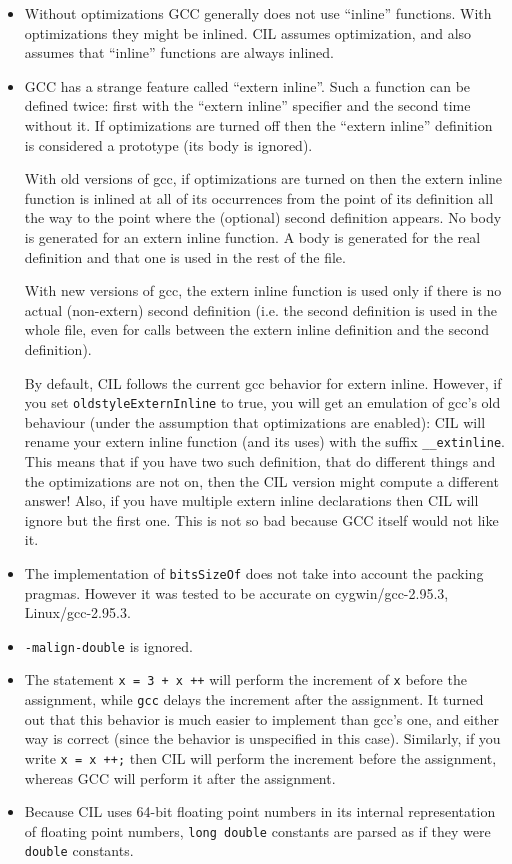 \documentclass[letterpaper]{article}
\def\t#1{{\tt #1}}
\begin{document}
\begin{itemize}
\item Without optimizations GCC generally does not use ``inline'' functions.
With optimizations they might be inlined. CIL assumes optimization, and also
assumes that ``inline'' functions are always inlined.

\item GCC has a strange feature called ``extern inline''. Such a function can
be defined twice: first with the ``extern inline'' specifier and the second
time without it. If optimizations are turned off then the ``extern inline''
definition is considered a prototype (its body is ignored).

With old versions of gcc, if optimizations
are turned on then the extern inline function is inlined at all of its
occurrences from the point of its definition all the way to the point where the
(optional) second definition appears. No body is generated for an extern
inline function. A body is generated for the real definition and that one is
used in the rest of the file.

With new versions of gcc, the extern inline function is used only if there is no
actual (non-extern) second definition (i.e. the second definition is used in the
whole file, even for calls between the extern inline definition and the second
definition).

By default, CIL follows the current gcc behavior for extern
inline. However, if you set \t{oldstyleExternInline} to true, you will
get an emulation of gcc's old behaviour (under the assumption that
optimizations are enabled): CIL will rename your extern inline
function (and its uses) with the suffix \t{\_\_extinline}. This means
that if you have two such definition, that do different things and the
optimizations are not on, then the CIL version might compute a
different answer! Also, if you have multiple extern inline
declarations then CIL will ignore but the first one. This is not so
bad because GCC itself would not like it.

\item The implementation of \t{bitsSizeOf} does not take into account the
  packing pragmas. However it was tested to be accurate on cygwin/gcc-2.95.3,
  Linux/gcc-2.95.3.

\item \t{-malign-double} is ignored.

\item The statement \t{x = 3 + x ++} will perform the increment of \t{x}
  before the assignment, while \t{gcc} delays the increment after the
  assignment. It turned out that this behavior is much easier to implement
  than gcc's one, and either way is correct (since the behavior is unspecified
  in this case). Similarly, if you write \t{x = x ++;} then CIL will perform
  the increment before the assignment, whereas GCC will perform it
  after the assignment.

\item Because CIL uses 64-bit floating point numbers in its internal
  representation of floating point numbers, \t{long double} constants
  are parsed as if they were \t{double} constants.

\end{itemize}
\end{document}
